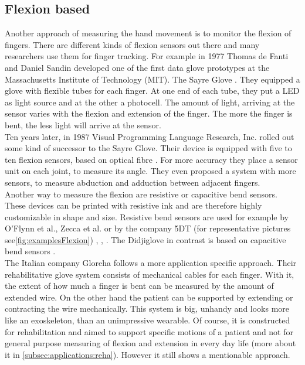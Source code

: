 \subsection{Flexion based} \label{subsec:approaches:flexion}
Another approach of measuring the hand movement is to monitor the flexion of fingers. There are different kinds of flexion sensors out there and many researchers use them for finger tracking. For example in 1977 Thomas de Fanti and Daniel Sandin developed one of the first data glove prototypes at the Massachusetts Institute of Technology (MIT). The Sayre Glove  \cite{sturman1994survey}. They equipped a glove with flexible tubes for each finger. At one end of each tube, they put a LED as light source and at the other a photocell. The amount of light, arriving at the sensor varies with the flexion and extension of the finger. The more the finger is bent, the less light will arrive at the sensor.\\
Ten years later, in 1987 Visual Programming Language Research, Inc. rolled out some kind of successor to the Sayre Glove. Their device is equipped with five to ten flexion sensors, based on optical fibre \cite{zimmerman1985optical}. For more accuracy they place a sensor unit on each joint, to measure its angle. They even proposed a system with more sensors, to measure abduction and adduction between adjacent fingers.\\
Another way to measure the flexion are resistive or capacitive bend sensors. These devices can be printed with resistive ink and are therefore highly customizable in shape and size. Resistive bend sensors are used for example by O'Flynn et al., Zecca et al. or by the company 5DT (for representative pictures see\ref{fig:examplesFlexion}) \cite{o2013novel}, \cite{zecca2007development}, \cite{FifthDimension}. The Didjiglove in contrast is based on capacitive bend sensors \cite{sturman1994survey}.\\
The Italian company Gloreha \cite{Gloreha} follows a more application specific approach. Their rehabilitative glove system consists of mechanical cables for each finger. With it, the extent of how much a finger is bent can be measured by the amount of extended wire. On the other hand the patient can be supported by extending or contracting the wire mechanically. This system is big, unhandy and looks more like an exoskeleton, than an unimpressive wearable. Of course, it is constructed for rehabilitation and aimed to support specific motions of a patient and not for general purpose measuring of flexion and extension in every day life (more about it in \ref{subsec:applications:reha}). However it still shows a mentionable approach.

